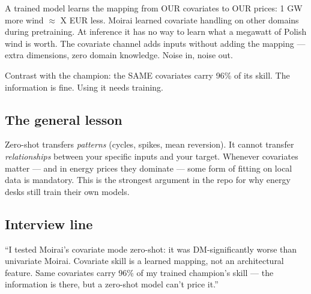 A trained model learns the mapping from OUR covariates to OUR
prices: 1 GW more wind $\approx$ X EUR less. Moirai learned
covariate handling on other domains during pretraining.
At inference it has no way to learn what a megawatt of Polish wind
is worth. The covariate channel adds inputs without adding the
mapping --- extra dimensions, zero domain knowledge. Noise in,
noise out.

Contrast with the champion: the SAME covariates carry 96\% of its
skill. The information is fine. Using it needs training.

\subsection{The general lesson}

Zero-shot transfers \emph{patterns} (cycles, spikes, mean
reversion). It cannot transfer \emph{relationships} between your
specific inputs and your target. Whenever covariates matter ---
and in energy prices they dominate --- some form of fitting on
local data is mandatory. This is the strongest argument in the
repo for why energy desks still train their own models.

\subsection{Interview line}

``I tested Moirai's covariate mode zero-shot: it was DM-significantly
worse than univariate Moirai. Covariate skill is a learned mapping,
not an architectural feature. Same covariates carry 96\% of my
trained champion's skill --- the information is there, but a
zero-shot model can't price it.''
